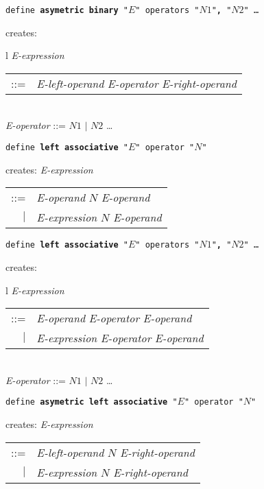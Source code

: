 \documentclass[12pt]{article}
\newcommand{\TT}[1]{{\tt \bfseries #1}}
\newenvironment{indpar}[1][0.3in]%
	{\begin{list}{}%
		     {\setlength{\itemsep}{0in}%
		      \setlength{\topsep}{0in}%
		      \setlength{\parsep}{1ex}%
		      \setlength{\labelwidth}{#1}%
		      \setlength{\leftmargin}{#1}%
		      \addtolength{\leftmargin}{\labelsep}}%
	 \item}%
	{\end{list}}
\begin{document}
\begin{indpar}
{\tt define \TT{asymetric binary} "$E$" operators "$N1$"\TT{,} "$N2$" \ldots}
\begin{indpar}
creates: \begin{tabular}[t]{l}
         {\em E-expression} \begin{tabular}[t]{rl}
                            ::= & {\em E-left-operand} {\em E-operator}
			          {\em E-right-operand} \\
                            \end{tabular} \\
         {\em E-operator} ::= $N1$ $|$ $N2$ \ldots \\
	 \end{tabular}
\end{indpar}

{\tt define \TT{left associative} "$E$" operator "$N$"}
\begin{indpar}
creates: {\em E-expression} \begin{tabular}[t]{rl}
                            ::= & {\em E-operand} $N$ {\em E-operand} \\
                            $|$ & {\em E-expression} $N$ {\em E-operand} \\
                            \end{tabular}
\end{indpar}

{\tt define \TT{left associative} "$E$" operators "$N1$"\TT{,} "$N2$" \ldots}
\begin{indpar}
creates: \begin{tabular}[t]{l}
         {\em E-expression} \begin{tabular}[t]{rl}
                            ::= & {\em E-operand} {\em E-operator}
			          {\em E-operand} \\
                            $|$ & {\em E-expression} {\em E-operator}
			          {\em E-operand} \\
                            \end{tabular} \\
         {\em E-operator} ::= $N1$ $|$ $N2$ \ldots \\
	 \end{tabular}
\end{indpar}

{\tt define \TT{asymetric left associative} "$E$" operator "$N$"}
\begin{indpar}
creates: {\em E-expression} \begin{tabular}[t]{rl}
                            ::= & {\em E-left-operand} $N$
			          {\em E-right-operand} \\
                            $|$ & {\em E-expression} $N$
			          {\em E-right-operand} \\
                            \end{tabular}
\end{indpar}


\end{indpar}
\end{document}
